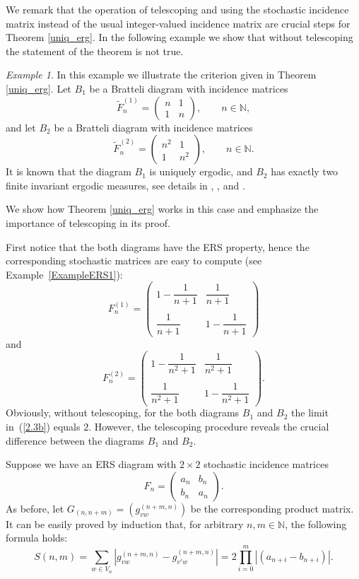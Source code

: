 \documentclass[11pt, english, reqno]{amsart}
\theoremstyle{definition}
\theoremstyle{remark}
\newtheorem{example}[defin]{Example}
\theoremstyle{plain}
\def\tl{\widetilde}
\numberwithin{equation}{section}
\begin{document}
We remark that the operation of telescoping and using the stochastic 
incidence matrix instead of the usual integer-valued incidence matrix are
 crucial steps for Theorem  
\ref{uniq_erg}. In the following example we show that without telescoping
the statement of the theorem is not true.


\begin{example} \label{ex 3.2} In this example we illustrate the criterion 
given in
 Theorem \ref{uniq_erg}. Let $B_1$ be a Bratteli diagram with incidence
  matrices
$$
\tl F_n^{(1)} =
\begin{pmatrix}
n & 1\\
1 & n
\end{pmatrix}, \qquad n \in \mathbb N,
$$
and let $B_2$ be a Bratteli diagram with incidence matrices
$$
\tl F_n^{(2)} =
\begin{pmatrix}
n^2 & 1\\
1 & n^2
\end{pmatrix}, \qquad n \in \mathbb N.
$$
It is known that the diagram $B_1$ is uniquely ergodic, and $B_2$ has
exactly two finite invariant  ergodic measures, see details in
 \cite{BezuglyiKwiatkowskiMedynetsSolomyak2013},
 \cite[Example 3.6]{AdamskaBezuglyiKarpelKwiatkowski2016},  and
 \cite{FerencziFisherTalet2009}.

We show how Theorem \ref{uniq_erg} works in this case and
emphasize  the importance of telescoping in its proof.

First notice that the both diagrams  have the ERS property, hence the
 corresponding stochastic matrices are easy to compute
 (see Example~\ref{ExampleERS1}):
$$
F^{(1)}_n =
\begin{pmatrix}
1 - \dfrac{1}{n+1} & \dfrac{1}{n+1}\\
\\
\dfrac{1}{n+1} & 1 - \dfrac{1}{n+1}
\end{pmatrix}
$$
and
$$
F^{(2)}_n =
\begin{pmatrix}
1 - \dfrac{1}{n^2+1} & \dfrac{1}{n^2+1}\\
\\
\dfrac{1}{n^2+1} & 1 - \dfrac{1}{n^2+1}
\end{pmatrix}.
$$
Obviously, without telescoping, for the both diagrams $B_1$ and $B_2$
the limit in~(\ref{2.3b})
 equals $2$. However, the telescoping procedure reveals the crucial
  difference between the diagrams $B_1$ and $B_2$.

Suppose we have an ERS diagram with $2 \times 2$ stochastic incidence
 matrices
$$
F_n =
\begin{pmatrix}
a_n & b_n\\
b_n & a_n
\end{pmatrix}.
$$
As before, let $G_{(n,n+m)} = (g_{vw}^{(n+m,n)})$ be the corresponding
 product matrix.
It can be easily proved  by induction that,  for arbitrary
$n, m  \in \mathbb{N}$, the following formula holds:
$$
S(n,m) = \sum_{w \in V_n} \left|g_{vw}^{(n+m,n)} - g_{v'w}^{(n+m,n)}\right| =
 2\prod_{i = 0}^{m}\left|(a_{n+i} - b_{n+i})\right|.
$$


\end{example}
\end{document}

